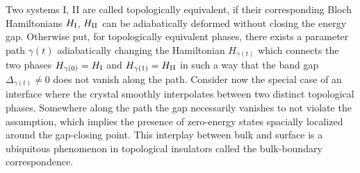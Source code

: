 Two systems I, II are called topologically equivalent, if their corresponding Bloch Hamiltonians $H_{\rm I}$, $H_{\rm II}$ can be adiabatically deformed without closing the energy gap.
Otherwise put, for topologically equivalent phases, there exists a parameter path $\gamma(t)$ adiabatically changing the Hamiltonian $H_{\gamma(t)}$ which connects the two phases $H_{\gamma(0)}=H_{\rm I}$ and $H_{\gamma(1)}=H_{\rm II}$ in such a way that the band gap $\Delta_{\gamma(t)}\neq0$ does not vanish along the path.
Consider now the special case of an interface where the crystal smoothly interpolates between two distinct topological phases.
Somewhere along the path the gap necessarily vanishes to not violate the assumption, which implies the presence of zero-energy states spacially localized around the gap-closing point.
This interplay between bulk and surface is a ubiquitous phenomenon in topological insulators called the bulk-boundary correspondence.

